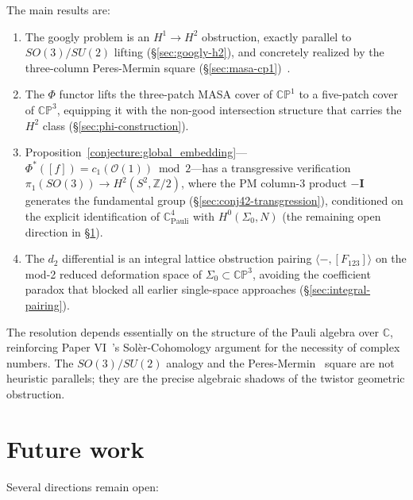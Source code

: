 \documentclass[11pt,a4paper]{article}
\theoremstyle{remark}
\newcommand{\CP}{\mathbb{CP}}
\newcommand{\C}{\mathbb{C}}
\newcommand{\Z}{\mathbb{Z}}
\newcommand{\cO}{\mathcal{O}}
\begin{document}
The main results are:
\begin{enumerate}
  \item The googly problem is an $H^1 \to H^2$ obstruction,
    exactly parallel to $SO(3)/SU(2)$ lifting (\S\ref{sec:googly-h2}),
    and concretely realized by the three-column Peres-Mermin
    square (\S\ref{sec:masa-cp1})~\cite{PeresMermin}.
  \item The $\Phi$ functor lifts the three-patch MASA cover of
    $\CP^1$ to a five-patch cover of $\CP^3$, equipping it with
    the non-good intersection structure that carries the $H^2$
    class (\S\ref{sec:phi-construction}).
  \item Proposition~\ref{conjecture:global_embedding}---$\Phi^*([f]) = c_1(\cO(1)) \bmod 2$---has
    a transgressive verification $\pi_1(SO(3)) \to H^2(S^2, \Z/2)$,
    where the PM column-3 product $-\mathbf{I}$ generates the
    fundamental group (\S\ref{sec:conj42-transgression}), conditioned
    on the explicit identification of $\C^4_{\text{Pauli}}$ with
    $H^0(\Sigma_0, N)$ (the remaining open direction in
    \S\ref{sec:future}).
  \item The $d_2$ differential is an integral lattice obstruction
    pairing $\langle -, [F_{123}] \rangle$ on the mod-2 reduced
    deformation space of $\Sigma_0 \subset \CP^3$, avoiding the
    coefficient paradox that blocked all earlier single-space
    approaches (\S\ref{sec:integral-pairing}).
\end{enumerate}

The resolution depends essentially on the structure of the Pauli
algebra over $\C$, reinforcing Paper VI~\cite{PaperVI}'s Sol\`er-Cohomology
argument for the necessity of complex numbers.  The $SO(3)/SU(2)$
analogy and the Peres-Mermin~\cite{PeresMermin} square are not heuristic parallels;
they are the precise algebraic shadows of the twistor geometric
obstruction.

\section{Future work}
\label{sec:future}

Several directions remain open:
\end{document}
